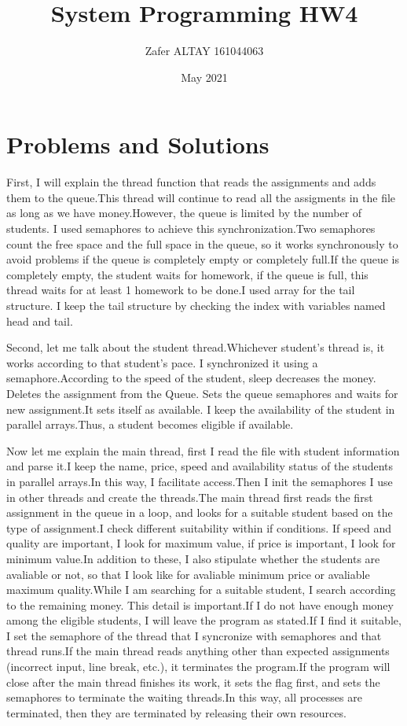 \documentclass{article}
\title{System Programming HW4}
\author{Zafer ALTAY 161044063 }
\date{May 2021}
\begin{document}
\maketitle

\section{Problems and Solutions}

First, I will explain the thread function that reads the assignments and adds them to the queue.This thread will continue to read all the assigments in the file as long as we have money.However, the queue is limited by the number of students. I used semaphores to achieve this synchronization.Two semaphores count the free space and the full space in the queue, so it works synchronously to avoid problems if the queue is completely empty or completely full.If the queue is completely empty, the student waits for homework, if the queue is full, this thread waits for at least 1 homework to be done.I used array for the tail structure. I keep the tail structure by checking the index with variables named head and tail.

Second, let me talk about the student thread.Whichever student's thread is, it works according to that student's pace. I synchronized it using a semaphore.According to the speed of the student, sleep decreases the money. Deletes the assignment from the Queue. Sets the queue semaphores and waits for new assignment.It sets itself as available. I keep the availability of the student in parallel arrays.Thus, a student becomes eligible if available.

Now let me explain the main thread, first I read the file with student information and parse it.I keep the name, price, speed and availability status of the students in parallel arrays.In this way, I facilitate access.Then I init the semaphores I use in other threads and create the threads.The main thread first reads the first assignment in the queue in a loop, and looks for a suitable student based on the type of assignment.I check different suitability within if conditions. If speed and quality are important, I look for maximum value, if price is important, I look for minimum value.In addition to these, I also stipulate whether the students are avaliable or not, so that I look like for avaliable minimum price or avaliable maximum quality.While I am searching for a suitable student, I search according to the remaining money. This detail is important.If I do not have enough money among the eligible students, I will leave the program as stated.If I find it suitable, I set the semaphore of the thread that I syncronize with semaphores and that thread runs.If the main thread reads anything other than expected assignments (incorrect input, line break, etc.), it terminates the program.If the program will close after the main thread finishes its work, it sets the flag first, and sets the semaphores to terminate the waiting threads.In this way, all processes are terminated, then they are terminated by releasing their own resources.
\end{document}
